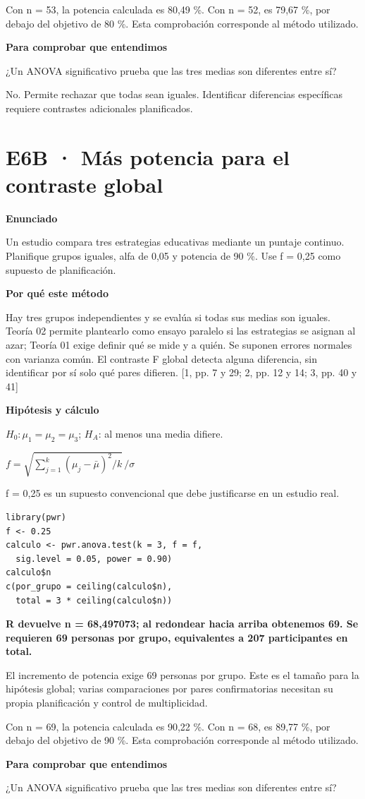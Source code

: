 \documentclass[10pt,a4paper]{article}
\newcommand{\etiqueta}[1]{\par{\bfseries\color{Blue}#1}\par}
\newcommand{\cajares}[1]{\par\colorbox{Pale}{\parbox{\dimexpr\linewidth-2\fboxsep}{\vspace{4pt}\textbf{\color{Navy}#1}\vspace{4pt}}}\par}
\begin{document}
{\small\color{Gray}Con n = 53, la potencia calculada es 80,49 \%. Con n = 52, es 79,67 \%, por debajo del objetivo de 80 \%. Esta comprobación corresponde al método utilizado.}
\etiqueta{Para comprobar que entendimos}
¿Un ANOVA significativo prueba que las tres medias son diferentes entre sí?

{\small No. Permite rechazar que todas sean iguales. Identificar diferencias específicas requiere contrastes adicionales planificados.}
\clearpage
\section*{E6B · Más potencia para el contraste global}
\etiqueta{Enunciado}
Un estudio compara tres estrategias educativas mediante un puntaje continuo. Planifique grupos iguales, alfa de 0,05 y potencia de 90 \%. Use f = 0,25 como supuesto de planificación.
\etiqueta{Por qué este método}
Hay tres grupos independientes y se evalúa si todas sus medias son iguales. Teoría 02 permite plantearlo como ensayo paralelo si las estrategias se asignan al azar; Teoría 01 exige definir qué se mide y a quién. Se suponen errores normales con varianza común. El contraste F global detecta alguna diferencia, sin identificar por sí solo qué pares difieren. [1, pp. 7 y 29; 2, pp. 12 y 14; 3, pp. 40 y 41]
\etiqueta{Hipótesis y cálculo}
$H_0:\mu_1=\mu_2=\mu_3$; $H_A$: al menos una media difiere.

$f=\sqrt{\sum_{j=1}^{k}(\mu_j-\bar\mu)^2/k}\,/\sigma$

f = 0,25 es un supuesto convencional que debe justificarse en un estudio real.
\begin{Verbatim}
library(pwr)
f <- 0.25
calculo <- pwr.anova.test(k = 3, f = f,
  sig.level = 0.05, power = 0.90)
calculo$n
c(por_grupo = ceiling(calculo$n),
  total = 3 * ceiling(calculo$n))
\end{Verbatim}
\cajares{R devuelve n = 68,497073; al redondear hacia arriba obtenemos 69. Se requieren 69 personas por grupo, equivalentes a 207 participantes en total.}
El incremento de potencia exige 69 personas por grupo. Este es el tamaño para la hipótesis global; varias comparaciones por pares confirmatorias necesitan su propia planificación y control de multiplicidad.

{\small\color{Gray}Con n = 69, la potencia calculada es 90,22 \%. Con n = 68, es 89,77 \%, por debajo del objetivo de 90 \%. Esta comprobación corresponde al método utilizado.}
\etiqueta{Para comprobar que entendimos}
¿Un ANOVA significativo prueba que las tres medias son diferentes entre sí?
\end{document}
